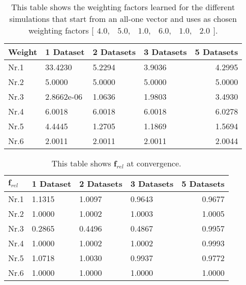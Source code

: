 \begin{table}[h!]
	\centering
	\begin{tabular}{@{}llllr@{}} \toprule
		\textbf{Weight}   & 1 Dataset    & 2 Datasets     & 3 Datasets & 5 Datasets\\ \midrule
		Nr.1       		  &33.4230       & 5.2294       & 3.9036 & 4.2995 		\\
		Nr.2              & 5.0000         & 5.0000          & 5.0000 &5.0000      \\
		Nr.3              & 2.8662e-06     & 1.0636      & 1.9803   &3.4930   \\
		Nr.4              & 6.0018           & 6.0018            &   6.0018&6.0278     \\
		Nr.5              & 4.4445     & 1.2705      & 1.1869 &1.5694      \\
		Nr.6              & 2.0011        & 2.0011         & 2.0011 & 2.0044     \\ \bottomrule
	\end{tabular}
	\caption{This table shows the weighting factors learned for the different simulations that start from an all-one vector and uses as chosen weighting factors $\bigl[ \begin{smallmatrix} 4.0,&5.0,&1.0,&6.0,&1.0,&2.0\end{smallmatrix}\bigr]$.}
	\label{tab:complex_learning_weights}
\end{table}

\begin{table}[h!]
	\centering
	\begin{tabular}{@{}llllr@{}} \toprule
		$\bm{f}_{rel}$   & 1 Dataset    & 2 Datasets & 3 Datasets&5 Datasets\\ \midrule
		Nr.1       		  &1.1315        & 1.0097       & 0.9643&0.9677		\\
		Nr.2              & 1.0000         & 1.0002     & 1.0003&1.0005        \\
		Nr.3              & 0.2865     & 0.4496     	& 0.4867  &0.9957     \\
		Nr.4              & 1.0000           & 1.0002   &   1.0002 &0.9993     \\
		Nr.5              & 1.0718     & 1.0030         & 0.9937 &0.9772       \\
		Nr.6              & 1.0000        & 1.0000      & 1.0000 &1.0000    \\ \bottomrule
	\end{tabular}
	\caption{This table shows $\bm{f}_{rel}$ at convergence.}
	\label{tab:complex_frel}
\end{table}

